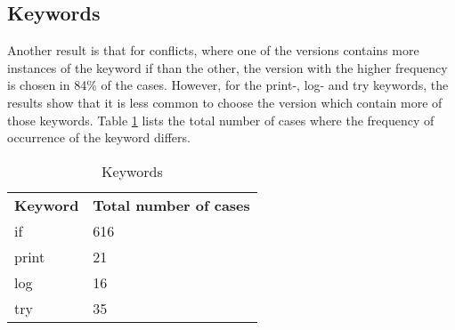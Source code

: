 
\subsection{Keywords}
Another result is that for conflicts, where one of the versions contains more instances of the keyword if than the other, the version with the higher frequency is chosen in 84\% of the cases. However, for the print-, log- and try keywords, the results show that it is less common to choose the version which contain more of those keywords. Table \ref{table:keywords} lists the total number of cases where the frequency of occurrence of the keyword differs.
\begin{table}
\caption{Keywords}\label{table:keywords}
\begin{tabular}{ p{8cm} p{6cm} }
\hline
\multicolumn{1}{c}{\textbf{Keyword}} & \multicolumn{1}{c}{\textbf{Total number of cases}}\\
if & 616\\
print & 21\\
log & 16\\
try & 35\\
\end{tabular}
\end{table}


